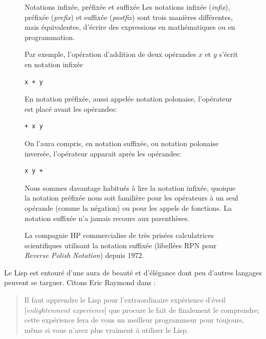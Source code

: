 \begin{figure}[t]
  \label{fig:informatique:notations}
  \setlength{\FrameRule}{1pt}
  \begin{titled-frame}{Notations infixée, préfixée et suffixée}
    Les notations infixée (\emph{infix}),
    préfixée (\emph{prefix}) et
    suffixée (\emph{postfix}) sont trois
    manières différentes, mais équivalentes, d'écrire des expressions
    en mathématiques ou en programmation.

    Par exemple, l'opération d'addition de deux opérandes $x$ et $y$
    s'écrit en notation infixée
\begin{lstlisting}
x + y
\end{lstlisting}
    En notation préfixée, aussi appelée notation polonaise,
    l'opérateur est placé avant les opérandes:
\begin{lstlisting}
+ x y
\end{lstlisting}
    On l'aura compris, en notation suffixée, ou notation polonaise
    inversée, l'opérateur apparait après les opérandes:
\begin{lstlisting}
x y +
\end{lstlisting}
    Nous sommes davantage habitués à lire la notation infixée, quoique
    la notation préfixée nous soit familière pour les opérateurs à un
    seul opérande (comme la négation) ou pour les appels de fonctions.
    La notation suffixée n'a jamais recours aux parenthèses.

    La compagnie HP commercialise de très prisées calculatrices
    scientifiques utilisant la notation suffixée (libellées RPN pour
    \emph{Reverse Polish Notation}) depuis 1972.
  \end{titled-frame}
\end{figure}

Le Lisp est entouré d'une aura de beauté et d'élégance dont peu
d'autres langages peuvent se targuer. Citons Eric Raymond dans
:
\begin{quote}
  Il faut apprendre le Lisp pour l'extraordinaire expérience d'éveil
  [\emph{enlightenment experience}] que procure le fait de finalement
  le comprendre; cette expérience fera de vous un meilleur programmeur
  pour toujours, même si vous n'avez plus vraiment à utiliser le Lisp.
\end{quote}

